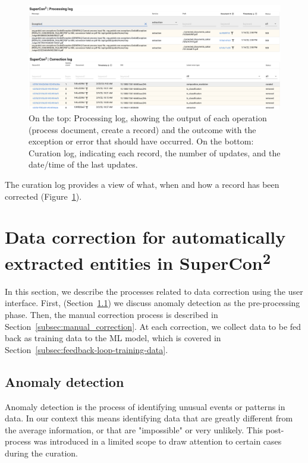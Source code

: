 \documentclass[a4paper]{article}
\begin{document}
\begin{figure}[ht]
  \centering
  \includegraphics[width=1\textwidth]{images/processing-curation-log.png} 
  \caption{On the top: Processing log, showing the output of each operation (process document, create a record) and the outcome with the exception or error that should have occurred. On the bottom: Curation log, indicating each record, the number of updates, and the date/time of the last updates.}
  \label{fig:processing-curation-log}
\end{figure}

The curation log provides a view of what, when and how a record has been corrected (Figure~\ref{fig:processing-curation-log}).



\section{Data correction for automatically extracted entities in SuperCon\textsuperscript{2}}
\label{sec:data-correction}

In this section, we describe the processes related to data correction using the user interface. 
First, (Section~\ref{subsec:anomaly-detection}) we discuss anomaly detection as the pre-processing phase. 
Then, the manual correction process is described in Section~\ref{subsec:manual_correction}. 
At each correction, we collect data to be fed back as training data to the ML model, which is covered in Section~\ref{subsec:feedback-loop-training-data}.

\subsection{Anomaly detection}
\label{subsec:anomaly-detection}
Anomaly detection is the process of identifying unusual events or patterns in data. 
In our context this means identifying data that are greatly different from the average information, or that are "impossible" or very unlikely.
This post-process was introduced in a limited scope to draw attention to certain cases during the curation.
\end{document}
